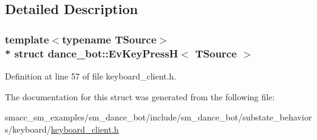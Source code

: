 \subsection{Detailed Description}
\subsubsection*{template$<$typename T\+Source$>$\\*
struct dance\+\_\+bot\+::\+Ev\+Key\+Press\+H$<$ T\+Source $>$}



Definition at line 57 of file keyboard\+\_\+client.\+h.



The documentation for this struct was generated from the following file\+:\begin{DoxyCompactItemize}
\item 
smacc\+\_\+sm\+\_\+examples/sm\+\_\+dance\+\_\+bot/include/sm\+\_\+dance\+\_\+bot/substate\+\_\+behaviors/keyboard/\hyperlink{keyboard__client_8h}{keyboard\+\_\+client.\+h}\end{DoxyCompactItemize}
